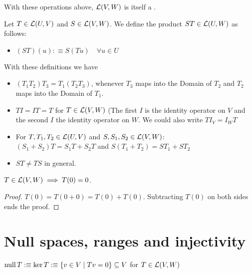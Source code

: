 \setcounter{thm}{5}
\begin{thm}
    With these operations above, ${\mathcal{L}(V,W)}$ is itself a \vs.
\end{thm}

\setcounter{thm}{6}
\begin{mydef}
    Let $T \in {\mathcal{L}(U, V)}$ and $S \in {\mathcal{L}(V, W)}$. We define the product $ST \in {\mathcal{L}(U, W)}$ as follows:
    \begin{itemize}
    	\item[] $(ST)(u) :\equiv S(Tu) \quad \forall u \in U$
    \end{itemize}
\end{mydef}

\begin{thm}
    With these definitions we have
    \begin{itemize}
    	\item {} $(T_1 T_2) T_3 = T_1 (T_2 T_3)$, whenever $T_3$ maps into the Domain of $T_2$ and $T_2$ maps into the Domain of $T_1$.
    	\item {} $T I = I T = T$ for $T \in {\mathcal{L}(V,W)}$ (The first $I$ is the identity operator on $V$ and the second $I$ the identity operator on $W$. We could also write $T I_V = I_W T$
    	\item {} For $T, T_1, T_2 \in {\mathcal{L}(U, V)}$ and $S, S_1, S_2 \in {\mathcal{L}(V, W)}$: \\ $(S_1 + S_2)T=S_1 T + S_2 T$ and $S(T_1 + T_2)=S T_1 + S T_2$
    	\item {} $ST \neq TS$ in general.
    \end{itemize}
\end{thm}

\setcounter{thm}{9}
\begin{thm}
     $T\in {\mathcal{L}(V,W)} \implies T(0)=0$.
\end{thm}
\begin{proof}
    $T(0) = T(0+0) = T(0) + T(0)$. Subtracting $T(0)$ on both sides ends the proof.
\end{proof}

\pagebreak

\section{Null spaces, ranges and injectivity}

\begin{mydef}
    $\operatorname{null} T :\equiv \ker T :\equiv \{ v \in V \mid Tv=0\} \subseteq V$ for $T \in {\mathcal{L}(V,W)}$
\end{mydef}

